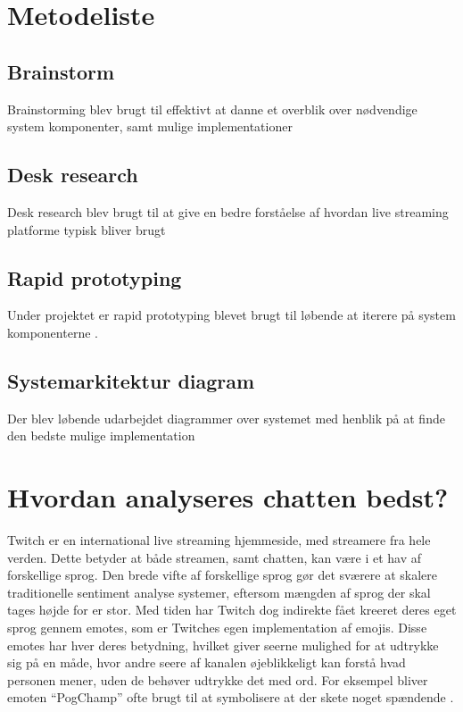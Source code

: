 \documentclass{article}
\begin{document}
\section{Metodeliste}
\subsection{Brainstorm}
Brainstorming blev brugt til effektivt at danne et overblik over nødvendige system komponenter, samt mulige implementationer \cite{kobenhavns_universitet_klassisk_nodate}
\subsection{Desk research}
Desk research blev brugt til at give en bedre forståelse af hvordan live streaming platforme typisk bliver brugt \cite{albrechtsen_guide_2020}

\subsection{Rapid prototyping}
Under projektet er rapid prototyping blevet brugt til løbende at iterere på system komponenterne \cite{kobenhavns_universitet_hurtige_nodate}.


\subsection{Systemarkitektur diagram}
Der blev løbende udarbejdet diagrammer over systemet med henblik på at finde den bedste mulige implementation \cite{lucidchart_how_2021}

\section{Hvordan analyseres chatten bedst?}

Twitch er en international live streaming hjemmeside, med streamere fra hele verden. Dette betyder at både streamen, samt chatten, kan være i et hav af forskellige sprog. Den brede vifte af forskellige sprog gør det sværere at skalere traditionelle sentiment analyse systemer, eftersom mængden af sprog der skal tages højde for er stor. Med tiden har Twitch dog indirekte fået kreeret deres eget sprog gennem emotes, som er Twitches egen implementation af emojis. Disse emotes har hver deres betydning, hvilket giver seerne mulighed for at udtrykke sig på en måde, hvor andre seere af kanalen øjeblikkeligt kan forstå hvad personen mener, uden de behøver udtrykke det med ord. For eksempel bliver emoten “PogChamp” ofte brugt til at symbolisere at der skete noget spændende \cite{alexander_guide_2018}.
\end{document}
